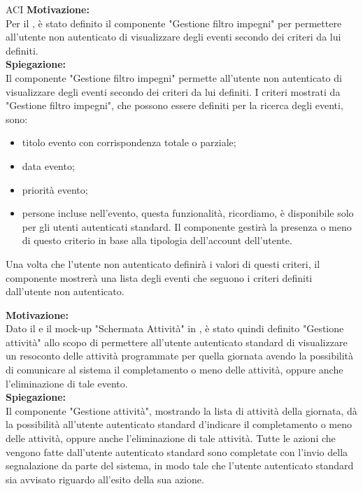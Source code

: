 \begin{listaPersonale}{ACI}
    \textbf{Motivazione:}\\
    Per il , è stato definito il componente "Gestione filtro impegni" per permettere all'utente non autenticato di visualizzare degli eventi secondo dei criteri da lui definiti.\\
    \textbf{Spiegazione:}\\
    Il componente "Gestione filtro impegni" permette all'utente non autenticato di visualizzare degli eventi secondo dei criteri da lui definiti. I criteri mostrati da "Gestione filtro impegni", che possono essere definiti per la ricerca degli eventi, sono:
    \begin{itemize}
        \item titolo evento con corrispondenza totale o parziale;
        \item data evento;
        \item priorità evento;
        \item persone incluse nell'evento, questa funzionalità, ricordiamo, è disponibile solo per gli utenti autenticati standard. Il componente gestirà la presenza o meno di questo criterio in base alla tipologia dell'account dell'utente.
    \end{itemize}
    Una volta che l'utente non autenticato definirà i valori di questi criteri, il componente mostrerà una lista degli eventi che seguono i criteri definiti dall'utente non autenticato.


    \textbf{Motivazione:}\\
    Dato il  e il mock-up "Schermata Attività" in , è stato quindi definito "Gestione attività" allo scopo di permettere all'utente autenticato standard di visualizzare un resoconto delle attività programmate per quella giornata avendo la possibilità di comunicare al sistema il completamento o meno delle attività, oppure anche l'eliminazione di tale evento.\\
    \textbf{Spiegazione:}\\
    Il componente "Gestione attività", mostrando la lista di attività della giornata, dà la possibilità all'utente autenticato standard d'indicare il completamento o meno delle attività, oppure anche l'eliminazione di tale attività. Tutte le azioni che vengono fatte dall'utente autenticato standard sono completate con l'invio della segnalazione da parte del sistema, in modo tale che l'utente autenticato standard sia avvisato riguardo all'esito della sua azione.



\end{listaPersonale}
